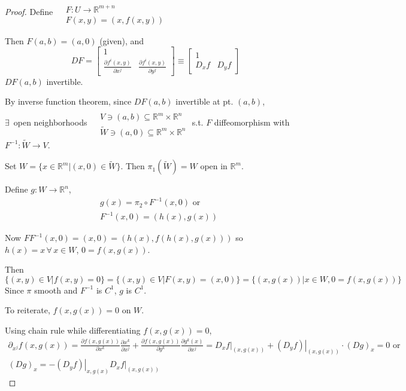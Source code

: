 \begin{proof}
  Define $\begin{aligned} & \quad \\
    & F: U \to \mathbb{R}^{m+n}   \\
    & F(x,y) = (x,f(x,y)) \end{aligned}$

Then $F(a,b) = (a,0)$ (given), and 
\[
DF = \left[ \begin{matrix} 1 & \\ 
    \frac{ \partial f^i(x,y)}{ \partial x^j} & \frac{ \partial f^i(x,y) }{ \partial y^j } \end{matrix} \right] \equiv \left[ \begin{matrix} 1 & \\
    D_xf & D_yf \end{matrix} \right]
\]
$DF(a,b)$ invertible.  

By inverse function theorem, since $DF(a,b)$ invertible at pt. $(a,b)$, \\
$\exists \, $ open neighborhoods $\begin{aligned} & \quad \\
  & V \ni (a,b) \subseteq \mathbb{R}^m \times \mathbb{R}^n \\
  & \widetilde{W} \ni (a,0) \subseteq \mathbb{R}^m \times \mathbb{R}^n \end{aligned}$ s.t. $F$ diffeomorphism with $F^{-1}: \widetilde{W} \to V$. 

Set $W = \lbrace x \in \mathbb{R}^m | (x,0) \in \widetilde{W}\rbrace$.  Then $\pi_1(\widetilde{W}) =W$ open in $\mathbb{R}^m$.  

Define $g:W\to \mathbb{R}^n$, 
\[
\begin{aligned}
  & g(x) = \pi_2 \circ F^{-1}(x,0) \text{ or } \\ 
  & F^{-1}(x,0) = (h(x),g(x))
\end{aligned}
\]

Now $FF^{-1}(x,0) = (x,0) = (h(x), f(h(x),g(x)) )$ so $h(x)=x \, \forall \, x \in W$, $0 = f(x,g(x))$.  

Then
\[
\lbrace (x,y) \in V | f(x,y) = 0 \rbrace = \lbrace (x,y) \in V | F(x,y) = (x,0) \rbrace = \lbrace (x,g(x)) | x \in W, 0 = f(x,g(x)) \rbrace
\]
Since $\pi$ smooth and $F^{-1}$ is $C^1$, $g$ is $C^1$.  

To reiterate, $f(x,g(x)) =0$ on $W$.

Using chain rule while differentiating $f(x,g(x))=0$, 
\[
\begin{gathered}
\partial_{x^j} f(x,g(x)) = \frac{ \partial f(x,g(x)) }{ \partial x^k} \frac{ \partial x^k}{ \partial x^j}+ \frac{ \partial f(x,g(x))}{ \partial y^k}\frac{ \partial g^k(x)}{\partial x^j} = \left. D_x f \right|_{(x,g(x))} + \left. (D_yf) \right|_{(x,g(x))} \cdot (Dg)_x = 0 \text{ or }  \\
(Dg)_x = -\left. (D_yf) \right|_{x,g(x)} \left. D_xf \right|_{(x,g(x))}
\end{gathered}
\]



\end{proof}

